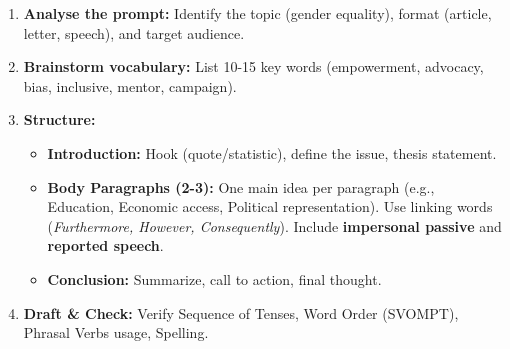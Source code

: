 \documentclass[11pt]{article}
\begin{document}
\begin{bilan}
\begin{methode}
\begin{enumerate}
  \item \textbf{Analyse the prompt:} Identify the topic (gender equality), format (article, letter, speech), and target audience.
  \item \textbf{Brainstorm vocabulary:} List 10-15 key words (empowerment, advocacy, bias, inclusive, mentor, campaign).
  \item \textbf{Structure:}
    \begin{itemize}
      \item \textbf{Introduction:} Hook (quote/statistic), define the issue, thesis statement.
      \item \textbf{Body Paragraphs (2-3):} One main idea per paragraph (e.g., Education, Economic access, Political representation). Use linking words (\emph{Furthermore, However, Consequently}). Include \textbf{impersonal passive} and \textbf{reported speech}.
      \item \textbf{Conclusion:} Summarize, call to action, final thought.
    \end{itemize}
  \item \textbf{Draft \& Check:} Verify Sequence of Tenses, Word Order (SVOMPT), Phrasal Verbs usage, Spelling.
\end{enumerate}
\end{methode}

\end{bilan}
\end{document}
